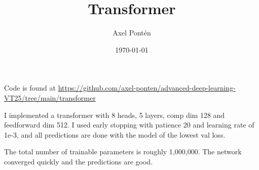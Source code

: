 \documentclass[12pt, a4paper]{article}
\title{Transformer}
\author{Axel Pontén}
\date{\today}
\begin{document}
\maketitle

Code is found at \url{https://github.com/axel-ponten/advanced-deep-learning-VT25/tree/main/transformer}

I implemented a transformer with 8 heads, 5 layers, comp dim 128 and feedforward dim 512.
I used early stopping with patience 20 and learning rate of 1e-3, and all predictions are done with the model of the lowest val loss.

The total number of trainable parameters is roughly 1,000,000. The network converged quickly and the predictions are good.
\end{document}
